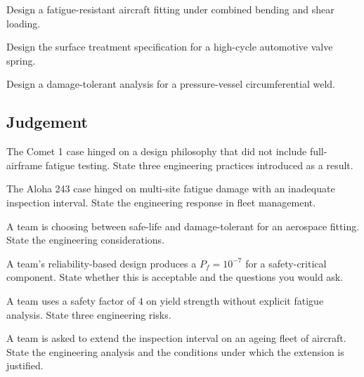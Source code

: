\begin{exercise}
Design a fatigue-resistant aircraft fitting under combined bending and shear loading.
\end{exercise}

\begin{exercise}
Design the surface treatment specification for a high-cycle automotive valve spring.
\end{exercise}

\begin{exercise}
Design a damage-tolerant analysis for a pressure-vessel circumferential weld.
\end{exercise}

\subsection*{Judgement}

\begin{exercise}
The Comet 1 case \cite{acc:cohen-comet-report-1955} hinged on a design philosophy that did not include full-airframe fatigue testing. State three engineering practices introduced as a result.
\end{exercise}

\begin{exercise}
The Aloha 243 case \cite{acc:ntsb-aar94-04} hinged on multi-site fatigue damage with an inadequate inspection interval. State the engineering response in fleet management.
\end{exercise}

\begin{exercise}
A team is choosing between safe-life and damage-tolerant for an aerospace fitting. State the engineering considerations.
\end{exercise}

\begin{exercise}
A team's reliability-based design produces a $P_f = 10^{-7}$ for a safety-critical component. State whether this is acceptable and the questions you would ask.
\end{exercise}

\begin{exercise}
A team uses a safety factor of $4$ on yield strength without explicit fatigue analysis. State three engineering risks.
\end{exercise}

\begin{exercise}
A team is asked to extend the inspection interval on an ageing fleet of aircraft. State the engineering analysis and the conditions under which the extension is justified.
\end{exercise}

